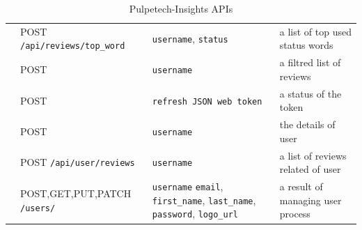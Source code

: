 \begin{table}[!htbp]
\begin{center}
\begin{tabular}{|p{}|p{}|p{}|p{}|}
  \cmidrule(lr){2-4}
                                                      & POST {\tt /api/reviews/top\_word}
                         & {\tt username},
                         {\tt status}
                                    & a list of top used status words \\   

  \cmidrule(lr){2-4}
                      & POST \hspace{20mm}{\tt /api/reviews/type}
                                   & {\tt username}
                                                      & a filtred list of reviews\\   

  \cmidrule(lr){2-4}
                      & POST \hspace{2mm}{\tt /api/token/refresh/}
                                   & {\tt refresh JSON web token}
                                   & a status of the token\\   

  \cmidrule(lr){2-4}
                      & POST \hspace{30mm}{\tt /api/user}
                                   & {\tt username}
                                                      & the details of user\\   

  \cmidrule(lr){2-4}
                      &POST \hspace{15mm} {\tt /api/user/reviews}
                                   & {\tt username}
                                                      &  a list of reviews related of user\\   



  \cmidrule(lr){2-4}
                      & POST,GET,PUT,PATCH {\tt /users/}

                      & {\tt username}
                      {\tt email},%
                      {\tt first\_name},
                      {\tt last\_name},
                      {\tt password},
                      {\tt logo\_url}
                      &   a result of managing user process
                      \\   


      \midrule[.1em] 
    \end{tabular}
  \end{center}
    \caption{Pulpetech-Insights APIs}
    \label{fig:apis}

\end{table}



